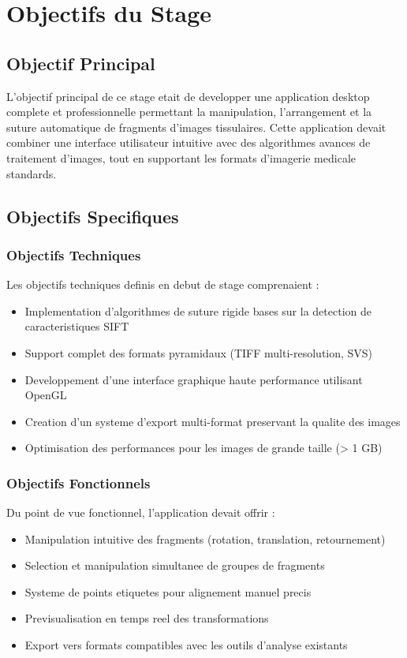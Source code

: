 \documentclass[12pt,a4paper]{article}
\begin{document}
\section{Objectifs du Stage}

\subsection{Objectif Principal}

L'objectif principal de ce stage etait de developper une application desktop complete et professionnelle permettant la manipulation, l'arrangement et la suture automatique de fragments d'images tissulaires. Cette application devait combiner une interface utilisateur intuitive avec des algorithmes avances de traitement d'images, tout en supportant les formats d'imagerie medicale standards.

\subsection{Objectifs Specifiques}

\subsubsection{Objectifs Techniques}

Les objectifs techniques definis en debut de stage comprenaient :

\begin{itemize}
\item Implementation d'algorithmes de suture rigide bases sur la detection de caracteristiques SIFT
\item Support complet des formats pyramidaux (TIFF multi-resolution, SVS)
\item Developpement d'une interface graphique haute performance utilisant OpenGL
\item Creation d'un systeme d'export multi-format preservant la qualite des images
\item Optimisation des performances pour les images de grande taille (> 1 GB)
\end{itemize}

\subsubsection{Objectifs Fonctionnels}

Du point de vue fonctionnel, l'application devait offrir :

\begin{itemize}
\item Manipulation intuitive des fragments (rotation, translation, retournement)
\item Selection et manipulation simultanee de groupes de fragments
\item Systeme de points etiquetes pour alignement manuel precis
\item Previsualisation en temps reel des transformations
\item Export vers formats compatibles avec les outils d'analyse existants
\end{itemize}
\end{document}

